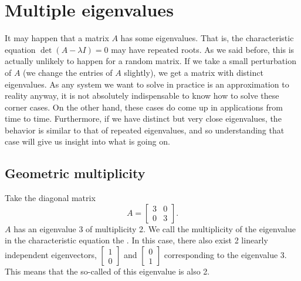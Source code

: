 \documentclass[12pt]{book}
\begin{document}

\sectionnewpage
\section{Multiple eigenvalues} \label{sec:multeigen}


It may happen that a matrix $A$ has some  eigenvalues.
That is, the characteristic equation $\det(A-\lambda I) = 0$ may have
repeated roots.  As we said before, this is actually unlikely to happen
for a random matrix.  If we take a small perturbation of $A$ (we change the
entries of $A$ slightly), we get a matrix with distinct eigenvalues.  As
any system we want to solve in practice is an approximation to reality
anyway, it is not absolutely indispensable to know how to solve these corner cases.  
On the other hand, these cases do come up in applications from time to time.
Furthermore, if we have distinct but very close eigenvalues, the behavior is
similar to that of repeated eigenvalues, and so understanding that case
will give us insight into what is going on.

\subsection{Geometric multiplicity}

Take the diagonal matrix
\begin{equation*}
A =
\begin{bmatrix}
3 & 0 \\ 0 & 3
\end{bmatrix} .
\end{equation*}
$A$ has an eigenvalue 3 of multiplicity 2.  We call the
multiplicity of the eigenvalue
in the characteristic equation the
\emph{}.  In this case, there also exist 2
linearly
independent eigenvectors,
$\left[ \begin{smallmatrix} 1 \\ 0 \end{smallmatrix} \right]$
and
$\left[ \begin{smallmatrix} 0 \\ 1 \end{smallmatrix} \right]$ corresponding
to the eigenvalue 3.  This means
that the so-called \emph{}
of this eigenvalue is also 2.
\end{document}
